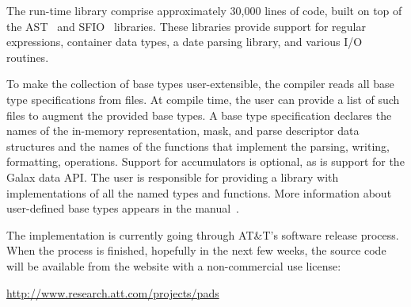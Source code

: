 \documentclass[times]{acm-sigplan}
\begin{document}
The \pads{} run-time library comprise approximately 30,000 lines of \C{} code, built on top of the AST~\cite{ast} and SFIO~\cite{sfio} libraries.
These libraries provide support for regular expressions, container data types, a date parsing library, and various I/O routines.  
 
To make the collection of base types user-extensible, the compiler reads all base type specifications from files.  
At compile time, the user can provide a list of such files to augment the provided base types.
A base type specification
declares the names of the in-memory representation, mask, and parse descriptor data structures and the names of the functions that implement the parsing, writing, formatting, \etc{} operations.  Support for accumulators is optional, as is support for the Galax data API.  The user is responsible for providing a \C{} library with implementations of all the named types and functions. 
More information about user-defined base types appears in the \pads{} manual~\cite{padsmanual}.

The \pads{} implementation is currently going through AT\&T's software
release process.  When the process is finished, hopefully in the next few weeks, the source code will be available from the \pads{} website with a non-commercial use license:
\begin{center}
\url{http://www.research.att.com/projects/pads}
\end{center}
 
\end{document}
